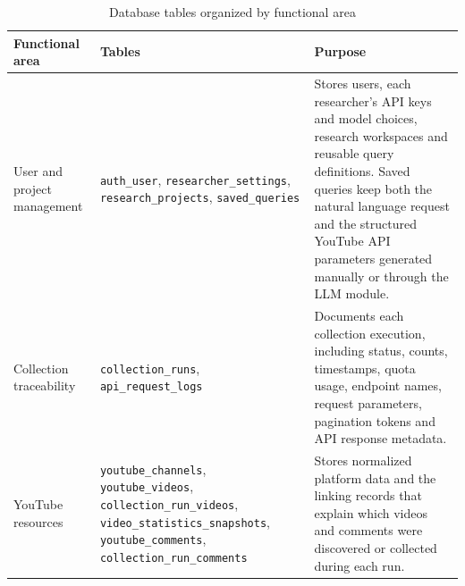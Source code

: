 \begin{table}[H]
    \centering
    \small
    \caption{Database tables organized by functional area}
    \label{tab:database_tables_by_area}
    \begin{tabularx}
        {\textwidth}{>{\raggedright\arraybackslash}p{3.2cm}>{\raggedright\arraybackslash}p{5.0cm}X}
        \toprule
        \textbf{Functional area}    & \textbf{Tables}                                                                                                                                                                                                                                                       & \textbf{Purpose}                                                                                                                                                                                                                                             \\
        \midrule
        User and project management & \texttt{auth\_user}, \texttt{researcher\_settings}, \texttt{research\_projects}, \texttt{saved\_queries}                                                                                                                                                              & Stores users, each researcher's API keys and model choices, research workspaces and reusable query definitions. Saved queries keep both the natural language request and the structured YouTube API parameters generated manually or through the LLM module. \\
        \midrule
        Collection traceability     & \texttt{collection\_runs}, \texttt{api\_request\_logs}                                                                                                                                                                                                                & Documents each collection execution, including status, counts, timestamps, quota usage, endpoint names, request parameters, pagination tokens and API response metadata.                                                                                     \\
        \midrule
        YouTube resources           & \texttt{youtube\_channels}, \texttt{youtube\_videos}, \texttt{collection\_\allowbreak run\_\allowbreak videos}, \texttt{video\_\allowbreak statistics\_\allowbreak snapshots}, \texttt{youtube\_comments}, \texttt{collection\_\allowbreak run\_\allowbreak comments} & Stores normalized platform data and the linking records that explain which videos and comments were discovered or collected during each run.                                                                                                                 \\

\end{tabularx}
\end{table}
